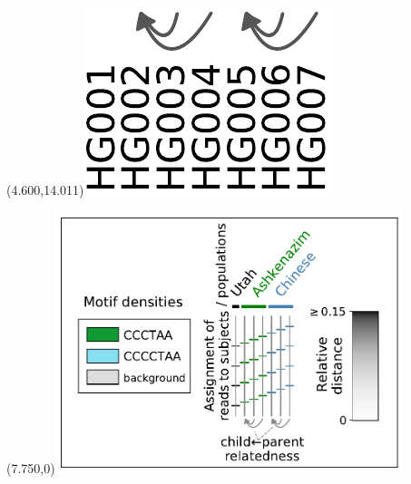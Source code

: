 \documentclass{article}
\begin{document}
\begin{textblock}{13}(4.600,14.011)\includegraphics[width=.91in,keepaspectratio]{Figure_4/fatter-arrows-labeled.pdf}\end{textblock}
\begin{textblock}{13}(7.750,0)\includegraphics[width=4.000in,keepaspectratio]{Figure_4/legend.pdf}\end{textblock}
\end{document}
